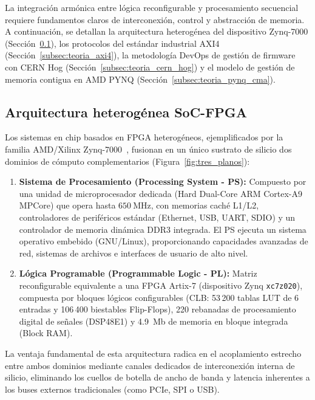 \documentclass[standalone]{subfiles}
\begin{document}
La integración armónica entre lógica reconfigurable y procesamiento secuencial requiere fundamentos claros de interconexión, control y abstracción de memoria. A continuación, se detallan la arquitectura heterogénea del dispositivo Zynq-7000 (Sección~\ref{subsec:teoria_soc_fpga}), los protocolos del estándar industrial AXI4 (Sección~\ref{subsec:teoria_axi4}), la metodología DevOps de gestión de firmware con CERN Hog (Sección~\ref{subsec:teoria_cern_hog}) y el modelo de gestión de memoria contigua en AMD PYNQ (Sección~\ref{subsec:teoria_pynq_cma}).

\subsection{Arquitectura heterogénea SoC-FPGA}
\label{subsec:teoria_soc_fpga}

Los sistemas en chip basados en FPGA heterogéneos, ejemplificados por la familia AMD/Xilinx Zynq-7000~\cite{xilinx_ug585}, fusionan en un único sustrato de silicio dos dominios de cómputo complementarios (Figura~\ref{fig:tres_planos}):

\begin{enumerate}
    \item \textbf{Sistema de Procesamiento (Processing System - PS):} Compuesto por una unidad de microprocesador dedicada (Hard Dual-Core ARM Cortex-A9 MPCore) que opera hasta $650~\text{MHz}$, con memorias caché L1/L2, controladores de periféricos estándar (Ethernet, USB, UART, SDIO) y un controlador de memoria dinámica DDR3 integrada. El PS ejecuta un sistema operativo embebido (GNU/Linux), proporcionando capacidades avanzadas de red, sistemas de archivos e interfaces de usuario de alto nivel.
    
    \item \textbf{Lógica Programable (Programmable Logic - PL):} Matriz reconfigurable equivalente a una FPGA Artix-7 (dispositivo Zynq \texttt{xc7z020}), compuesta por bloques lógicos configurables (CLB: 53\,200 tablas LUT de 6 entradas y 106\,400 biestables Flip-Flops), 220 rebanadas de procesamiento digital de señales (DSP48E1) y 4.9~Mb de memoria en bloque integrada (Block RAM).
\end{enumerate}

La ventaja fundamental de esta arquitectura radica en el acoplamiento estrecho entre ambos dominios mediante canales dedicados de interconexión interna de silicio, eliminando los cuellos de botella de ancho de banda y latencia inherentes a los buses externos tradicionales (como PCIe, SPI o USB).
\end{document}
